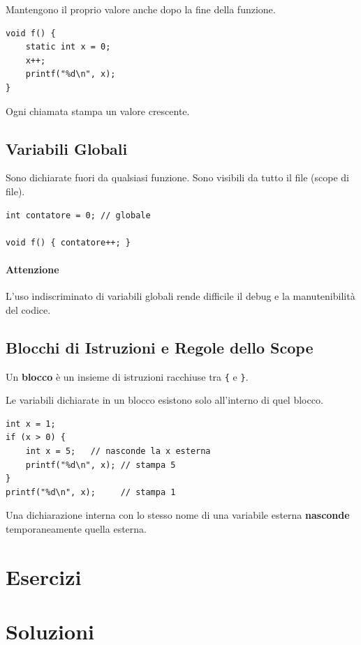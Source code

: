 \documentclass[oneside]{scrbook}
\begin{document}
Mantengono il proprio valore anche dopo la fine della funzione.

\begin{lstlisting}[style=cstyle]
void f() {
    static int x = 0;
    x++;
    printf("%d\n", x);
}
\end{lstlisting}

Ogni chiamata stampa un valore crescente.

\subsection{Variabili Globali}

Sono dichiarate fuori da qualsiasi funzione.
Sono visibili da tutto il file (scope di file).

\begin{lstlisting}[style=cstyle]
int contatore = 0; // globale

void f() { contatore++; }
\end{lstlisting}

\paragraph{Attenzione}  
L’uso indiscriminato di variabili globali rende difficile il debug e la manutenibilità del codice.

\subsection{Blocchi di Istruzioni e Regole dello Scope}

Un \textbf{blocco} è un insieme di istruzioni racchiuse tra \texttt{\{} e \texttt{\}}.

Le variabili dichiarate in un blocco esistono solo all’interno di quel blocco.

\begin{lstlisting}[style=cstyle]
int x = 1;
if (x > 0) {
    int x = 5;   // nasconde la x esterna
    printf("%d\n", x); // stampa 5
}
printf("%d\n", x);     // stampa 1
\end{lstlisting}

Una dichiarazione interna con lo stesso nome di una variabile esterna \textbf{nasconde} temporaneamente quella esterna.

\section{Esercizi}












\clearpage
\section*{Soluzioni}
\shipoutAnswer
\end{document}
